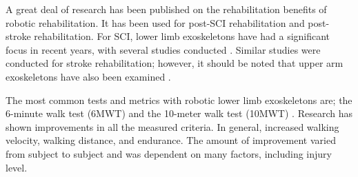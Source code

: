 A great deal of research has been published on the rehabilitation benefits of robotic rehabilitation. It has been used for post-SCI rehabilitation and post-stroke rehabilitation. For SCI, lower limb exoskeletons have had a significant focus in recent years, with several studies conducted \cite{esquenazi2012rewalk} \cite{zeilig2012safety} \cite{6876184}. Similar studies were conducted for stroke rehabilitation; however, it should be noted that upper arm exoskeletons have also been examined \cite{chang2013robot} \cite{ho2011emg}. 

The most common tests and metrics with robotic lower limb exoskeletons are; the 6-minute walk test (6MWT) and the 10-meter walk test (10MWT) \cite{amatachaya2014concurrent}. Research has shown improvements in all the measured criteria. In general, increased walking velocity, walking distance, and endurance. The amount of improvement varied from subject to subject and was dependent on many factors, including injury level.   
